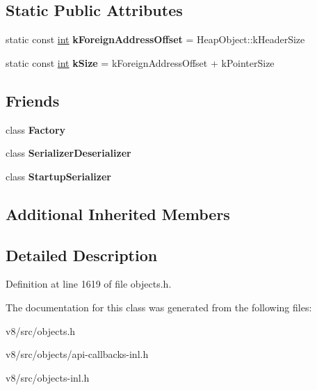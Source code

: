 \subsection*{Static Public Attributes}
\begin{DoxyCompactItemize}
\item 
\mbox{\label{classv8_1_1internal_1_1Foreign_af4241dc31655e2432335e9c5e9de11ff}} 
static const \mbox{\hyperlink{classint}{int}} {\bfseries k\+Foreign\+Address\+Offset} = Heap\+Object\+::k\+Header\+Size
\item 
\mbox{\label{classv8_1_1internal_1_1Foreign_a4c89f141a3a79948c4f3b078cf6688cf}} 
static const \mbox{\hyperlink{classint}{int}} {\bfseries k\+Size} = k\+Foreign\+Address\+Offset + k\+Pointer\+Size
\end{DoxyCompactItemize}
\subsection*{Friends}
\begin{DoxyCompactItemize}
\item 
\mbox{\label{classv8_1_1internal_1_1Foreign_a328c093d609680cca505905c6d49901a}} 
class {\bfseries Factory}
\item 
\mbox{\label{classv8_1_1internal_1_1Foreign_a776366ef8d8da81b674d9c9ca7f9a547}} 
class {\bfseries Serializer\+Deserializer}
\item 
\mbox{\label{classv8_1_1internal_1_1Foreign_a662801728886d8e54eeb04887fbec80c}} 
class {\bfseries Startup\+Serializer}
\end{DoxyCompactItemize}
\subsection*{Additional Inherited Members}


\subsection{Detailed Description}


Definition at line 1619 of file objects.\+h.



The documentation for this class was generated from the following files\+:\begin{DoxyCompactItemize}
\item 
v8/src/objects.\+h\item 
v8/src/objects/api-\/callbacks-\/inl.\+h\item 
v8/src/objects-\/inl.\+h\end{DoxyCompactItemize}
